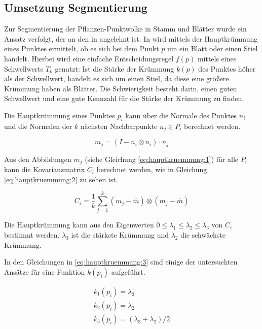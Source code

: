 \documentclass[12pt,titlepage, twoside]{article}
\begin{document}
\subsection{Umsetzung Segmentierung}
\label{sec:realisierung:implementierung3}

Zur Segmentierung der Pflanzen-Punktwolke in Stamm und Blätter wurde ein Ansatz verfolgt, der an den in \cite{ThreeBasics} angelehnt ist.
In \cite{ThreeBasics} wird mittels der Hauptkrümmung eines Punktes ermittelt, ob es sich bei dem Punkt $p$ um ein Blatt oder einen Stiel handelt. 
Hierbei wird eine einfache Entscheidungsregel $f(p)$ mittels eines Schwellwerts $T_k$ genutzt: 
Ist die Stärke der Krümmung $k(p)$ des Punktes höher als der Schwellwert, handelt es sich um einen Stiel, da diese eine größere Krümmung haben als Blätter.
Die Schwierigkeit besteht darin, einen guten Schwellwert und eine gute Kennzahl für die Stärke der Krümmung zu finden.

Die Hauptkrümmung eines Punktes $p_i$ kann über die Normale des Punktes $n_i$ und die Normalen der $k$ nächsten Nachbarpunkte $n_j \in P_i$ berechnet werden.

\begin{equation}
\label{eq:hauptkruemmung:1}
m_j = (I - n_i \otimes n_i ) \cdot n_j
\end{equation}

Aus den Abbildungen $m_j$ (siehe Gleichung \ref{eq:hauptkruemmung:1}) für alle $P_i$ kann die Kovarianzmatrix $C_i$ berechnet werden, wie in Gleichung \ref{eq:hauptkruemmung:2} zu sehen ist.

\begin{equation}
\label{eq:hauptkruemmung:2}
C_i = \frac{1}{k} \sum_{j=1}^k{(m_j - \bar{m}) \otimes (m_j - \bar{m})}
\end{equation}

Die Hauptkrümmung kann aus den Eigenwerten $0 \leq \lambda_1 \leq \lambda_2 \leq \lambda_3$ von $C_i$ bestimmt werden. $\lambda_3$ ist die stärkste Krümmung und $\lambda_2$ die schwächste Krümmung.

In den Gleichungen in \ref{eq:hauptkruemmung:3} sind einige der untersuchten Ansätze für eine Funktion $k(p_i)$ aufgeführt. 

\begin{equation}
\label{eq:hauptkruemmung:3}
\begin{array}{ll}
k_1(p_i) = \lambda_3 \\
k_2(p_i) = \lambda_2 \\
k_3(p_i) = (\lambda_3 + \lambda_2) / 2 
\end{array}{}
\end{equation}
\end{document}

